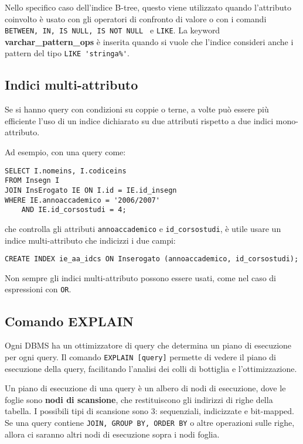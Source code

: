 \documentclass[a4paper, 10pt]{article}
\begin{document}
	 Nello specifico caso dell'indice B-tree, questo viene utilizzato quando l'attributo coinvolto è usato con gli operatori di confronto di valore o con i comandi \lstinline|BETWEEN, IN, IS NULL, IS NOT NULL | e \lstinline|LIKE|.
	 La keyword \textbf{varchar\_pattern\_ops} è inserita quando si vuole che l'indice consideri anche i pattern del tipo \lstinline|LIKE 'stringa%'|.
	 
	 \subsection{Indici multi-attributo}
	 Se si hanno query con condizioni su coppie o terne, a volte può essere più efficiente l'uso di un indice dichiarato su due attributi rispetto a due indici mono-attributo.
	 

	 
	 Ad esempio, con una query come:
	 \begin{lstlisting}
SELECT I.nomeins, I.codiceins
FROM Insegn I
JOIN InsErogato IE ON I.id = IE.id_insegn
WHERE IE.annoaccademico = '2006/2007'
	AND IE.id_corsostudi = 4;
	 \end{lstlisting}
	 che controlla gli attributi \verb|annoaccademico| e \verb|id_corsostudi|, è utile usare un indice multi-attributo che indicizzi i due campi:
	 \begin{lstlisting}
CREATE INDEX ie_aa_idcs ON Inserogato (annoaccademico, id_corsostudi);
	 \end{lstlisting}
	 Non sempre gli indici multi-attributo possono essere usati, come nel caso di espressioni con \lstinline|OR|.
	 
 	\subsection{Comando EXPLAIN}
	Ogni DBMS ha un ottimizzatore di query che determina un piano di esecuzione per ogni query. Il comando \lstinline|EXPLAIN [query]| permette di vedere il piano di esecuzione della query, facilitando l'analisi dei colli di bottiglia e l'ottimizzazione.
	
	Un piano di esecuzione di una query è un albero di nodi di esecuzione, dove le foglie sono \textbf{nodi di scansione}, che restituiscono gli indirizzi di righe della tabella. I possibili tipi di scansione sono 3: sequenziali, indicizzate e bit-mapped. Se una query contiene \lstinline|JOIN, GROUP BY, ORDER BY| o altre operazioni sulle righe, allora ci saranno altri nodi di esecuzione sopra i nodi foglia.
	
\end{document}

